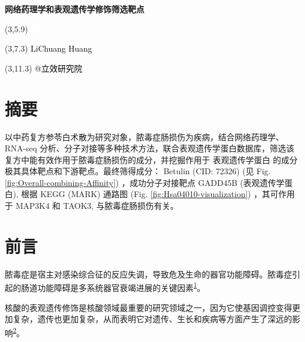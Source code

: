 \documentclass[
]{article}
\author{}
\date{\vspace{-2.5em}}
\begin{document}
\begin{titlepage} 
\begin{center} \textbf{\Huge
网络药理学和表观遗传学修饰筛选靶点} \vspace{4em}
\begin{textblock}{10}(3,5.9) \huge
\textbf{\textcolor{white}{2024-03-28}}
\end{textblock} \begin{textblock}{10}(3,7.3)
\Large \textcolor{black}{LiChuang Huang}
\end{textblock} \begin{textblock}{10}(3,11.3)
\Large \textcolor{black}{@立效研究院}
\end{textblock} \end{center} \end{titlepage}
\restoregeometry


\tableofcontents

\listoffigures

\listoftables

\newpage


\hypertarget{abstract}{%
\section{摘要}\label{abstract}}

以中药复方参苓白术散为研究对象，脓毒症肠损伤为疾病，结合网络药理学、RNA-seq 分析、分子对接等多种技术方法，联合表观遗传学蛋白数据库，筛选该复方中能有效作用于脓毒症肠损伤的成分，并挖掘作用于 表观遗传学蛋白 的成分极其具体靶点和下游靶点。最终筛得成分： Betulin (CID: 72326) (见 Fig. \ref{fig:Overall-combining-Affinity}) ，成功分子对接靶点 GADD45B (表观遗传学蛋白),
根据 KEGG (MARK) 通路图 (Fig. \ref{fig:Hsa04010-visualization}) ，其可作用于 MAP3K4 和 TAOK3, 与脓毒症肠损伤有关。

\hypertarget{introduction}{%
\section{前言}\label{introduction}}

脓毒症是宿主对感染综合征的反应失调，导致危及生命的器官功能障碍。脓毒症引起的肠道功能障碍是多系统器官衰竭进展的关键因素\textsuperscript{\protect\hyperlink{ref-TargetingStingKobrit2023}{1}}。

核酸的表观遗传修饰是核酸领域最重要的研究领域之一，因为它使基因调控变得更加复杂，遗传也更加复杂，从而表明它对遗传、生长和疾病等方面产生了深远的影响\textsuperscript{\protect\hyperlink{ref-EpigeneticModiChen2017}{2}}。
\end{document}
